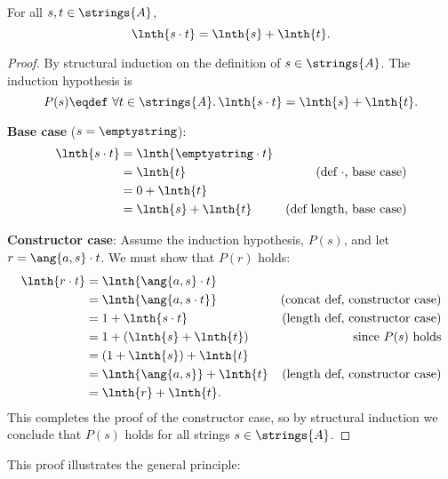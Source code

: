 \begin{theorem}\label{stAl+}
For all $s,t \in \strings{A}$,
\[
\lnth{s\cdot t} = \lnth{s} + \lnth{t}.
\]
\begin{proof}
By structural induction on the definition of $s \in \strings{A}$.   The
induction hypothesis is
\[
P(s) \eqdef\ \forall t \in \strings{A}.\, \lnth{s\cdot t} = \lnth{s} + \lnth{t}.
\]

\textbf{Base case} ($s = \emptystring$):
\begin{align*}
\lnth{s \cdot t}
   &= \lnth{\emptystring \cdot t}\\
   & = \lnth{t}
         & \text{(def $\cdot$, base case)}\\
   & = 0 + \lnth{t}\\
   & = \lnth{s} + \lnth{t}
         & \text{(def length, base case)}
\end{align*}

\textbf{Constructor case}: Assume the induction hypothesis, $P(s)$, and
let $r = \ang{a,s} \cdot t$.  We must show that $P(r)$ holds:
\begin{align*}
\lnth{r \cdot t}
    & = \lnth{\ang{a, s} \cdot t}\\
    & = \lnth{\ang{a,s \cdot t}}
        &  \text{(concat def, constructor case)}\\
    & = 1 + \lnth{s \cdot t}
        &  \text{(length def, constructor case)}\\
    & = 1 +  (\lnth{s} + \lnth{t})
        & \text{since $P(s)$ holds}\\
    & = (1 +  \lnth{s}) + \lnth{t}\\
    & = \lnth{\ang{a,s}} + \lnth{t}
        & \text{(length def, constructor case)}\\
    & = \lnth{r} + \lnth{t}.
\end{align*}
This completes the proof of the constructor case, so by structural
induction we conclude that $P(s)$ holds for all strings $s \in
\strings{A}$.
\end{proof}

\end{theorem}

This proof illustrates the general principle:



